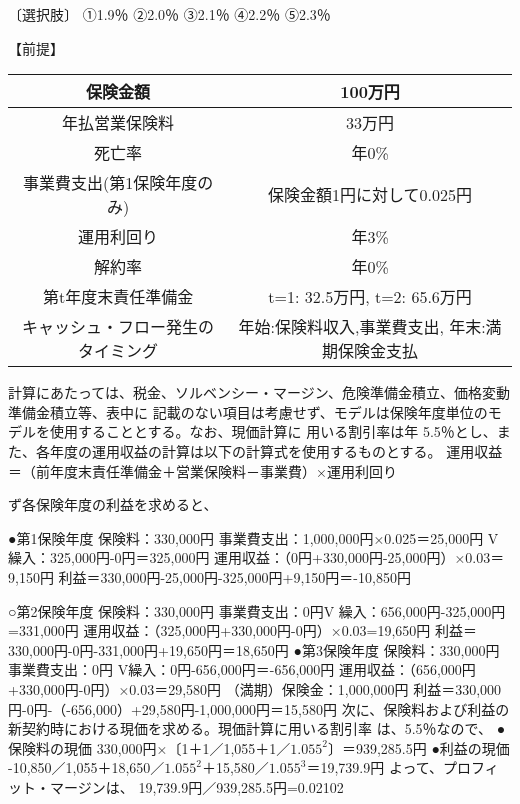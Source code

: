\documentclass[report,gutter=10mm,fore-edge=10mm,uplatex,dvipdfmx]{jlreq}
\begin{document}
〔選択肢〕
①1.9％ ②2.0％ ③2.1％
④2.2％ ⑤2.3％

【前提】

\begin{tabular}{|c|c|}
\hline 保険金額& 100万円\\ \hline
 年払営業保険料& 33万円\\ \hline
 死亡率&年0\%\\ \hline
 事業費支出(第1保険年度のみ)&保険金額1円に対して0.025円\\ \hline
 運用利回り&年3\%\\ \hline
 解約率&年0\%\\ \hline
 第t年度末責任準備金&t=1: 32.5万円, t=2: 65.6万円\\ \hline
キャッシュ・フロー発生のタイミング &年始:保険料収入,事業費支出, 年末:満期保険金支払 \\ \hline
\end{tabular}

計算にあたっては、税金、ソルベンシー・マージン、危険準備金積立、価格変動準備金積立等、表中に
記載のない項目は考慮せず、モデルは保険年度単位のモデルを使用することとする。なお、現価計算に
用いる割引率は年 5.5％とし、また、各年度の運用収益の計算は以下の計算式を使用するものとする。
運用収益＝（前年度末責任準備金＋営業保険料－事業費）×運用利回り

\answer{}
ず各保険年度の利益を求めると、

●第1保険年度
保険料：330,000円
事業費支出：1,000,000円×0.025＝25,000円
V繰入：325,000円-0円＝325,000円
運用収益：（0円+330,000円-25,000円）×0.03＝9,150円
利益＝330,000円-25,000円-325,000円+9,150円＝-10,850円

○第2保険年度 
保険料：330,000円
事業費支出：0円V
繰入：656,000円-325,000円=331,000円
運用収益：（325,000円+330,000円-0円）×0.03=19,650円
利益＝330,000円-0円-331,000円+19,650円＝18,650円
●第3保険年度
保険料：330,000円
事業費支出：0円
V繰入：0円-656,000円＝-656,000円
運用収益：（656,000円+330,000円-0円）×0.03＝29,580円
（満期）保険金：1,000,000円
利益＝330,000円-0円-（-656,000）+29,580円-1,000,000円＝15,580円
次に、保険料および利益の新契約時における現価を求める。現価計算に用いる割引率
は、5.5％なので、
●保険料の現価
330,000円×〔1＋1／1,055＋1／$1.055^2$〕＝939,285.5円
●利益の現価
-10,850／1,055＋18,650／$1.055^2$＋15,580／$1.055^3$＝19,739.9円
よって、プロフィット・マージンは、
19,739.9円／939,285.5円=0.02102
\end{document}
